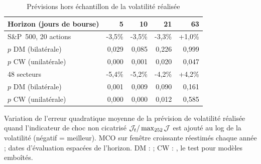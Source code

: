 \begin{table}[p]\centering\small
\caption{Prévisions hors échantillon de la volatilité réalisée}\label{tab:h7}
\begin{tabular}{@{}lrrrr@{}}\toprule
Horizon (jours de bourse) & 5 & 10 & 21 & 63 \\\midrule
S\&P~500, 20 actions & -3{,}5\% & -3{,}5\% & -3{,}3\% & +1{,}0\% \\
\quad $p$ DM (bilatérale) & 0{,}029 & 0{,}085 & 0{,}226 & 0{,}999 \\
\quad $p$ CW (unilatérale) & 0{,}000 & 0{,}001 & 0{,}020 & 0{,}047 \\
48 secteurs & -5{,}4\% & -5{,}2\% & -4{,}2\% & +4{,}2\% \\
\quad $p$ DM (bilatérale) & 0{,}001 & 0{,}009 & 0{,}090 & 0{,}161 \\
\quad $p$ CW (unilatérale) & 0{,}000 & 0{,}000 & 0{,}012 & 0{,}585 \\
\bottomrule\end{tabular}
\par\medskip\begin{minipage}{0.95\linewidth}\footnotesize
Variation de l'erreur quadratique moyenne de la prévision de volatilité réalisée quand l'indicateur de choc non cicatrisé
$\mathcal{J}_t/\max_{252}\mathcal{J}$ est ajouté au log de la volatilité (négatif = meilleur). MCO sur fenêtre croissante réestimés chaque année ; dates d'évaluation
espacées de l'horizon. DM : \citet{dm1995} ; CW : \citet{clarkwest2007}, le test pour modèles emboîtés.
\end{minipage}
\end{table}

